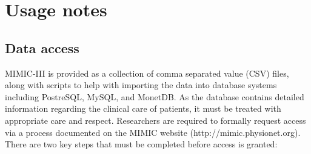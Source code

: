 \documentclass[english]{article}
\begin{document}


\section*{Usage notes}



\subsection*{Data access}

MIMIC-III is provided as a collection of comma separated value (CSV) files, along with scripts to help with importing the data into database systems including PostreSQL, MySQL, and MonetDB. As the database contains detailed information regarding the clinical care of patients, it must be treated with appropriate care and respect. Researchers are required to formally request access via a process documented on the MIMIC website (http://mimic.physionet.org). There are two key steps that must be completed before access is granted:
\end{document}

